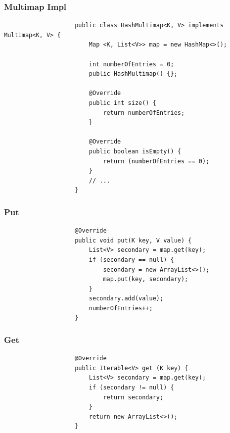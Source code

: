 \documentclass[a4paper, landscape, 8pt]{scrartcl}
\begin{document}
\begin{multicols*}{4}
                \subsubsection{Multimap Impl}
                    \begin{lstlisting}
                    public class HashMultimap<K, V> implements Multimap<K, V> {
                        Map <K, List<V>> map = new HashMap<>();

                        int numberOfEntries = 0;
                        public HashMultimap() {};

                        @Override
                        public int size() {
                            return numberOfEntries;
                        }

                        @Override
                        public boolean isEmpty() {
                            return (numberOfEntries == 0);
                        }
                        // ...
                    }
                    \end{lstlisting}
                \subsubsection{Put}
                    \begin{lstlisting}
                    @Override
                    public void put(K key, V value) {
                        List<V> secondary = map.get(key);
                        if (secondary == null) {
                            secondary = new ArrayList<>();
                            map.put(key, secondary);
                        }
                        secondary.add(value);
                        numberOfEntries++;
                    }
                    \end{lstlisting}
                \subsubsection{Get}
                    \begin{lstlisting}
                    @Override
                    public Iterable<V> get (K key) {
                        List<V> secondary = map.get(key);
                        if (secondary != null) {
                            return secondary;
                        }
                        return new ArrayList<>();
                    }
                    \end{lstlisting}

\end{multicols*}
\end{document}
